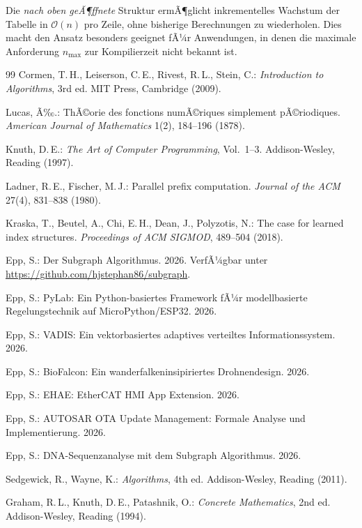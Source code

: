 ﻿\documentclass[12pt, a4paper]{article}
\newcommand{\Oh}{\mathcal{O}}
\theoremstyle{plain}
\theoremstyle{definition}
\theoremstyle{remark}
\renewcommand{\Oh}{\mathcal{O}}
\begin{document}
Die \emph{nach oben geÃ¶ffnete} Struktur ermÃ¶glicht inkrementelles
Wachstum der Tabelle in $\Oh(n)$ pro Zeile, ohne bisherige Berechnungen
zu wiederholen. Dies macht den Ansatz besonders geeignet fÃ¼r
Anwendungen, in denen die maximale Anforderung $n_{\max}$ zur
Kompilierzeit nicht bekannt ist.

\begin{thebibliography}{99}
    Cormen, T.\,H., Leiserson, C.\,E., Rivest, R.\,L., Stein, C.:
    \textit{Introduction to Algorithms}, 3rd ed.
    MIT Press, Cambridge (2009).

    Lucas, Ã‰.:
    ThÃ©orie des fonctions numÃ©riques simplement pÃ©riodiques.
    \textit{American Journal of Mathematics} 1(2), 184--196 (1878).

    Knuth, D.\,E.:
    \textit{The Art of Computer Programming}, Vol.\ 1--3.
    Addison-Wesley, Reading (1997).

    Ladner, R.\,E., Fischer, M.\,J.:
    Parallel prefix computation.
    \textit{Journal of the ACM} 27(4), 831--838 (1980).

    Kraska, T., Beutel, A., Chi, E.\,H., Dean, J., Polyzotis, N.:
    The case for learned index structures.
    \textit{Proceedings of ACM SIGMOD}, 489--504 (2018).

    Epp, S.:
    Der Subgraph Algorithmus. 2026. VerfÃ¼gbar unter \url{https://github.com/hjstephan86/subgraph}.

    Epp, S.:
    PyLab: Ein Python-basiertes Framework fÃ¼r modellbasierte
    Regelungstechnik auf MicroPython/ESP32. 2026.

    Epp, S.:
    VADIS: Ein vektorbasiertes adaptives verteiltes Informationssystem. 2026.

    Epp, S.:
    BioFalcon: Ein wanderfalkeninsipiriertes Drohnendesign. 2026.

    Epp, S.:
    EHAE: EtherCAT HMI App Extension. 2026.

    Epp, S.:
    AUTOSAR OTA Update Management: Formale Analyse und
    Implementierung. 2026.

    Epp, S.:
    DNA-Sequenzanalyse mit dem Subgraph Algorithmus. 2026.

    Sedgewick, R., Wayne, K.:
    \textit{Algorithms}, 4th ed.
    Addison-Wesley, Reading (2011).

    Graham, R.\,L., Knuth, D.\,E., Patashnik, O.:
    \textit{Concrete Mathematics}, 2nd ed.
    Addison-Wesley, Reading (1994).
\end{thebibliography}
\end{document}
